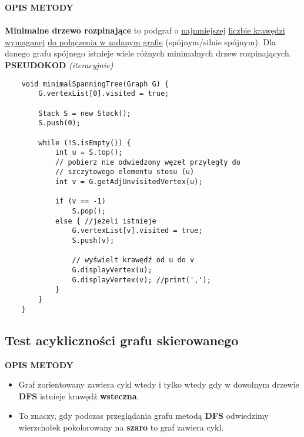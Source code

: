 \documentclass[algorytmy.tex]{subfiles}
\begin{document}
    \textbf{OPIS METODY} \\\\
    \textbf{Minimalne drzewo rozpinające} to podgraf o \underline{najmniejszej}
    \underline{liczbie krawędzi}
    \underline{wymaganej} \underline{do połączenia w zadanym grafie}
    (spójnym/silnie spójnym). Dla danego grafu spójnego istnieje wiele różnych
    minimalnych drzew rozpinających.\\

    \textbf{PSEUDOKOD} \textit{(iteracyjnie)}
    \begin{verbatim}
    void minimalSpanningTree(Graph G) {
        G.vertexList[0].visited = true;

        Stack S = new Stack();
        S.push(0);

        while (!S.isEmpty()) {
            int u = S.top();
            // pobierz nie odwiedzony węzeł przyległy do
            // szczytowego elementu stosu (u)
            int v = G.getAdjUnvisitedVertex(u);

            if (v == -1)
                S.pop();
            else { //jeżeli istnieje
                G.vertexList[v].visited = true;
                S.push(v);

                // wyświelt krawędź od u do v
                G.displayVertex(u);
                G.displayVertex(v); //print(',');
            }
        }
    }
    \end{verbatim}

\pagebreak
\subsection{Test acykliczności grafu skierowanego}

\textbf{OPIS METODY}
\begin{itemize}
    \item Graf zorientowany zawiera cykl wtedy i tylko wtedy gdy w dowolnym
        drzewie \textbf{DFS} istnieje krawędź \textbf{wsteczna}.
    \item To znaczy, gdy podczas przeglądania grafu metodą \textbf{DFS}
        odwiedzimy wierzchołek pokolorowany na \textbf{szaro} to graf zawiera
        cykl.
\end{itemize}
\end{document}
